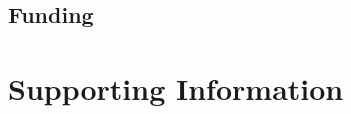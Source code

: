 \documentclass[11pt,oneside,letterpaper]{article}
\begin{document}
\subsection*{Funding} 




\pagebreak

\setcounter{figure}{0}
\setcounter{table}{0}
\setcounter{page}{1}
\renewcommand{\thefigure}{S\arabic{figure}}
\renewcommand{\thetable}{S\arabic{table}}
\renewcommand{\thepage}{S\arabic{page}}

\section*{Supporting Information}

\pagebreak
\end{document}
